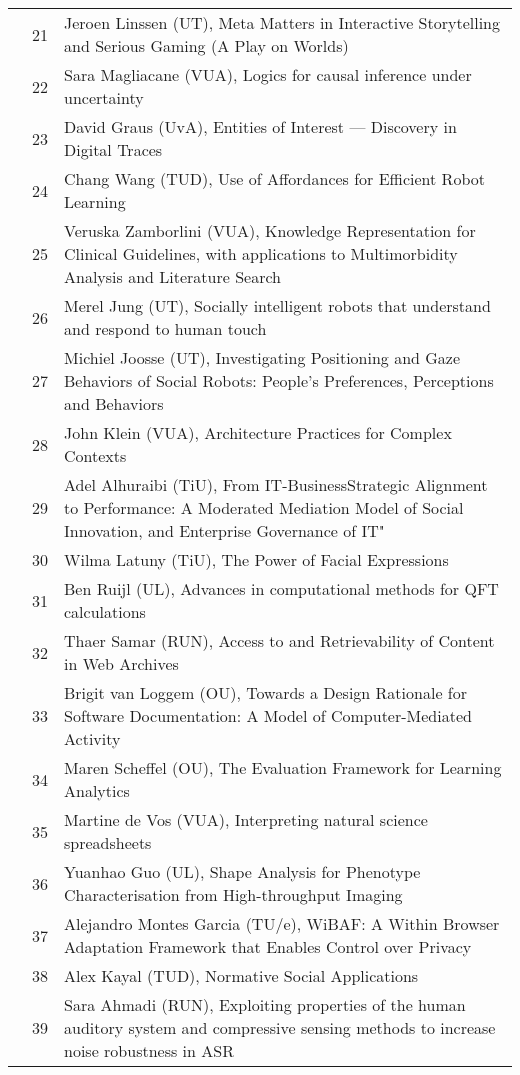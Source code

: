 \begin{xltabular}{\linewidth}{@{} l @{\hspace{0.5em}} l @{\hspace{1em}} X @{}}
	&	 21	&	 Jeroen Linssen (UT), Meta Matters in Interactive Storytelling and Serious Gaming (A Play on Worlds)\\
	&	 22	&	 Sara Magliacane (VUA), Logics for causal inference under uncertainty\\
	&	 23	&	 David Graus (UvA), Entities of Interest --- Discovery in Digital Traces\\
	&	 24	&	 Chang Wang (TUD), Use of Affordances for Efficient Robot Learning\\
	&	 25	&	 Veruska Zamborlini (VUA), Knowledge Representation for Clinical Guidelines, with applications to Multimorbidity Analysis and Literature Search\\
	&	 26	&	 Merel Jung (UT), Socially intelligent robots that understand and respond to human touch\\
	&	 27	&	 Michiel Joosse (UT), Investigating Positioning and Gaze Behaviors of Social Robots: People's Preferences, Perceptions and Behaviors\\
	&	 28	&	 John Klein (VUA), Architecture Practices for Complex Contexts\\
	&	 29	&	 Adel Alhuraibi (TiU), From IT-BusinessStrategic Alignment to Performance: A Moderated Mediation Model of Social Innovation, and Enterprise Governance of    IT"\\
	&	 30	&	 Wilma Latuny (TiU), The Power of Facial Expressions\\
	&	 31	&	 Ben Ruijl (UL), Advances in computational methods for QFT calculations\\
	&	 32	& 	 Thaer Samar (RUN), Access to and Retrievability of Content in Web Archives\\
	&	 33	&	 Brigit van Loggem (OU), Towards a Design Rationale for Software Documentation: A Model of Computer-Mediated Activity\\
	&	 34	&	 Maren Scheffel (OU), The Evaluation Framework for Learning Analytics \\
	&	 35	&	 Martine de Vos (VUA), Interpreting natural science spreadsheets \\
	&	 36	&	 Yuanhao Guo (UL), Shape Analysis for Phenotype Characterisation from High-throughput Imaging \\
	&	 37	&	 Alejandro Montes Garcia (TU/e), WiBAF: A Within Browser Adaptation Framework that Enables Control over Privacy \\
	&	 38	&	 Alex Kayal (TUD), Normative Social Applications \\
	&	 39	&	 Sara Ahmadi (RUN), Exploiting properties of the human auditory system and compressive sensing methods to increase   noise robustness in ASR \\

\end{xltabular}
